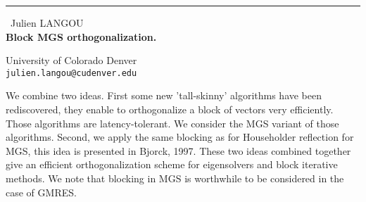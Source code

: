 \documentclass{report}
\begin{document}
\begin{center}
\rule{6in}{1pt} \
{\large Julien LANGOU \\
{\bf Block MGS orthogonalization.}}

University of Colorado Denver
\\
{\tt julien.langou@cudenver.edu}\end{center}

We combine two ideas. First some new 'tall-skinny' algorithms have been
rediscovered, they enable to orthogonalize a block of vectors very
efficiently. Those algorithms are latency-tolerant. We consider the MGS
variant of those algorithms. Second, we apply the same blocking as for
Householder reflection for MGS, this idea is presented in Bjorck, 1997.
These two ideas combined together give an efficient orthogonalization
scheme for eigensolvers and block iterative methods. We note that
blocking in MGS is worthwhile to be considered in the case of GMRES.
\end{document}
